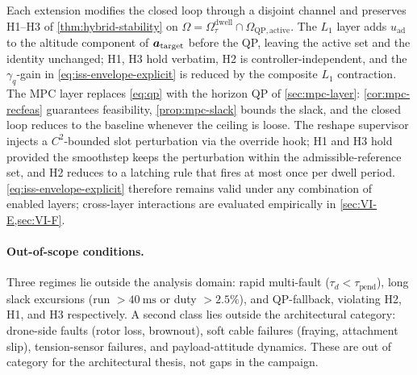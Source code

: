 Each extension modifies the closed loop through a disjoint channel and preserves H1--H3 of \cref{thm:hybrid-stability} on $\Omega = \Omega_\tau^{\mathrm{dwell}}\cap\Omega_{\mathrm{QP,active}}$. The $L_1$ layer adds $u_{\mathrm{ad}}$ to the altitude component of $\boldsymbol{a}_{\mathrm{target}}$ before the QP, leaving the active set and the identity unchanged; H1, H3 hold verbatim, H2 is controller-independent, and the $\gamma_q$-gain in \eqref{eq:iss-envelope-explicit} is reduced by the composite $L_1$ contraction. The MPC layer replaces \eqref{eq:qp} with the horizon QP of \cref{sec:mpc-layer}: \cref{cor:mpc-recfeas} guarantees feasibility, \cref{prop:mpc-slack} bounds the slack, and the closed loop reduces to the baseline whenever the ceiling is loose. The reshape supervisor injects a $C^2$-bounded slot perturbation via the override hook; H1 and H3 hold provided the smoothstep keeps the perturbation within the admissible-reference set, and H2 reduces to a latching rule that fires at most once per dwell period. \eqref{eq:iss-envelope-explicit} therefore remains valid under any combination of enabled layers; cross-layer interactions are evaluated empirically in \cref{sec:VI-E,sec:VI-F}.

\paragraph{Out-of-scope conditions.} Three regimes lie outside the analysis domain: rapid multi-fault ($\tau_d<\tau_{\mathrm{pend}}$), long slack excursions (run $>\SI{40}{\milli\second}$ or duty $>2.5\%$), and QP-fallback, violating H2, H1, and H3 respectively. A second class lies outside the architectural category: drone-side faults (rotor loss, brownout), soft cable failures (fraying, attachment slip), tension-sensor failures, and payload-attitude dynamics. These are out of category for the architectural thesis, not gaps in the campaign.
